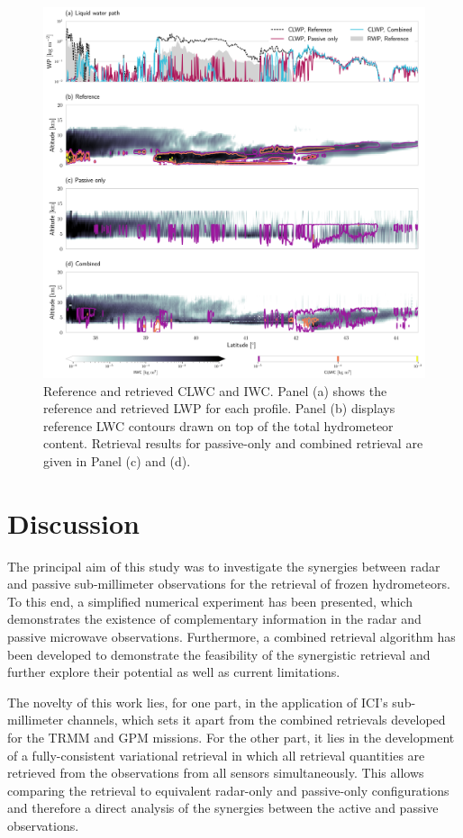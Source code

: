 \documentclass[journal abbreviation, manuscript]{copernicus}
\begin{document}
\begin{figure}
\centering
\includegraphics[width = \textwidth]{../plots/results_cw_b_LargePlateAggregate}
\caption{Reference and retrieved CLWC and IWC. Panel (a) shows the reference and
  retrieved LWP for each profile. Panel (b) displays reference LWC contours
  drawn on top of the total hydrometeor content. Retrieval results for
  passive-only and combined retrieval are given in Panel (c) and (d).}
\label{fig:results_cw_b}
\end{figure}


\section{Discussion}
\label{sec:discussion}

The principal aim of this study was to investigate the synergies between radar
and passive sub-millimeter observations for the retrieval of frozen
hydrometeors. To this end, a simplified numerical experiment has been presented,
which demonstrates the existence of complementary information in the radar and
passive microwave observations. Furthermore, a combined retrieval algorithm has
been developed to demonstrate the feasibility of the synergistic retrieval and
further explore their potential as well as current limitations.

The novelty of this work lies, for one part, in the application of ICI's
sub-millimeter channels, which sets it apart from the combined retrievals
developed for the TRMM and GPM missions. For the other part, it lies in the
development of a fully-consistent variational retrieval in which all retrieval
quantities are retrieved from the observations from all sensors simultaneously.
This allows comparing the retrieval to equivalent radar-only and passive-only
configurations and therefore a direct analysis of the synergies between the
active and passive observations.
\end{document}
